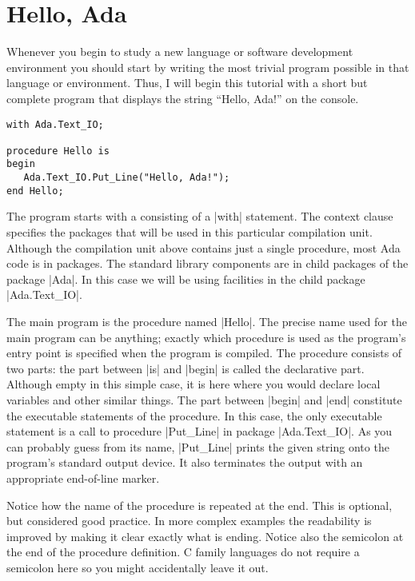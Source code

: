 \section{Hello, Ada}
\label{sec:hello-ada}

Whenever you begin to study a new language or software development environment you should start
by writing the most trivial program possible in that language or environment. Thus, I will begin
this tutorial with a short but complete program that displays the string ``Hello, Ada!'' on the
console.

\label{lst:hello-ada}
\begin{lstlisting}
with Ada.Text_IO;

procedure Hello is
begin
   Ada.Text_IO.Put_Line("Hello, Ada!");
end Hello;
\end{lstlisting}

\noindent The program starts with a  consisting of a |with| statement.
The context clause specifies the packages that will be used in this particular compilation unit.
Although the compilation unit above contains just a single procedure, most Ada code is in
packages. The standard library components are in child packages of the package |Ada|. In this
case we will be using facilities in the child package |Ada.Text_IO|.

The main program is the procedure named |Hello|. The precise name used for the main program can
be anything; exactly which procedure is used as the program's entry point is specified when the
program is compiled. The procedure consists of two parts: the part between |is| and |begin| is
called the declarative part. Although empty in this simple case, it is here where you would
declare local variables and other similar things. The part between |begin| and |end| constitute
the executable statements of the procedure. In this case, the only executable statement is a
call to procedure |Put_Line| in package |Ada.Text_IO|. As you can probably guess from its name,
|Put_Line| prints the given string onto the program's standard output device. It also terminates
the output with an appropriate end-of-line marker.

Notice how the name of the procedure is repeated at the end. This is optional, but considered
good practice. In more complex examples the readability is improved by making it clear exactly
what is ending. Notice also the semicolon at the end of the procedure definition. C family
languages do not require a semicolon here so you might accidentally leave it out.

